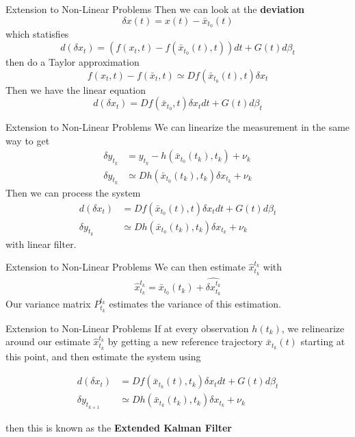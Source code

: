 \documentclass{beamer}
\begin{document}
\begin{frame}{Extension to Non-Linear Problems}
  Then we can look at the \textbf{deviation}
  \begin{equation}
    \delta x(t) = x(t) - \bar{x}_{t_0}(t) 
  \end{equation}
  which statisfies
  \begin{equation}
    d(\delta x_t) = (f(x_t,t) - f(\bar{x}_{t_0}(t),t)) dt + G(t) d\beta_t
  \end{equation}
  then do a Taylor approximation
  \begin{equation}
    f(x_t,t) - f(\bar{x}_t,t) \simeq Df(\bar{x}_{t_0}(t),t)  \delta x_t 
  \end{equation}
  Then we have the linear equation
  \begin{equation}
    d(\delta x_t) = Df(\bar{x}_{t_0} , t) \delta x_t dt + G(t) d\beta_t
  \end{equation}
\end{frame}

\begin{frame}{Extension to Non-Linear Problems}
  We can linearize the measurement in the same way to get
  \begin{align}
    \delta y_{t_k} &= y_{t_k} - h(\bar{x}_{t_0}(t_k), t_k) + \nu_k \\
    \delta y_{t_k} &\simeq Dh(\bar{x}_{t_0}(t_k),t_k) \delta x_{t_k} + \nu_k
  \end{align}
  Then we can process the system
  \begin{align}
    d(\delta x_t) &= Df(\bar{x}_{t_0}(t),t) \delta x_t dt + G(t) d\beta_t \\
    \delta y_{t_k} &\simeq Dh(\bar{x}_{t_0}(t_k),t_k) \delta x_{t_k} + \nu_k
  \end{align}
  with  linear filter.
\end{frame}

\begin{frame}{Extension to Non-Linear Problems}
  We can then estimate $\hat{x}_{t_k}^{t_k}$ with
  \begin{align}
    \hat{x}_{t_k}^{t_k} = \bar{x}_{t_0}(t_k) + \hat{\delta x_{t_k}^{t_k}}
  \end{align}
  Our variance matrix $P_{t_k}^{t_k}$ estimates the variance of this
  estimation.
\end{frame}

\begin{frame}{Extension to Non-Linear Problems}
  If at every observation $h(t_k)$, we relinearize around our estimate
  $\hat{x}_{t_k}^{t_k}$ by getting a new reference trajectory $\bar{x}_{t_k}(t)$
  starting at this point, and then estimate the system using

  
  \begin{align}
    d(\delta x_t) &= Df(\bar{x}_{t_k}(t),t_k) \delta x_t dt + G(t) d\beta_t \\
    \delta y_{t_{k+1}} &\simeq Dh(\bar{x}_{t_k}(t_k),t_k) \delta x_{t_k} + \nu_k
  \end{align}

  then this is known as the \textbf{Extended Kalman Filter}
\end{frame}
\end{document}
